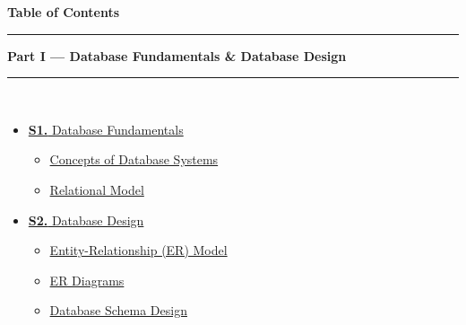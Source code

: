 \documentclass[12pt,a3paper]{article}
\begin{document}
\thispagestyle{fancy}
\begin{center}
  {\LARGE\bfseries\textcolor{pblue}{Table of Contents}}\\[6pt]
  \textcolor{pblue}{\rule{0.6\textwidth}{0.8pt}}
\end{center}
\vspace{6pt}

\begin{tcolorbox}[breakable,colback=cA!5,colframe=cA,boxrule=1pt,arc=5pt,
  left=8pt,right=8pt,top=8pt,bottom=8pt,before skip=4pt]
  {\large\bfseries\textcolor{cA}{Part I --- Database Fundamentals \& Database Design}}\\[5pt]
  \textcolor{cA!40}{\rule{\textwidth}{0.4pt}}\\[3pt]
  \small\begin{itemize}[leftmargin=1.2em,itemsep=1pt,label={\textcolor{cA}{$\triangleright$}}]
    \item \hyperref[sec:S1]{\textbf{S1.} Database Fundamentals}
      \begin{itemize}[leftmargin=1.5em,itemsep=0pt,label={\textcolor{cA}{$\cdot$}}]
        \item \hyperref[sub:s1-concepts]{Concepts of Database Systems}
        \item \hyperref[sub:s1-relational]{Relational Model}
      \end{itemize}
    \item \hyperref[sec:S2]{\textbf{S2.} Database Design}
      \begin{itemize}[leftmargin=1.5em,itemsep=0pt,label={\textcolor{cA}{$\cdot$}}]
        \item \hyperref[sub:s2-er]{Entity-Relationship (ER) Model}
        \item \hyperref[sub:s2-erdiag]{ER Diagrams}
        \item \hyperref[sub:s2-schema]{Database Schema Design}
      \end{itemize}
  \end{itemize}
\end{tcolorbox}
\end{document}
